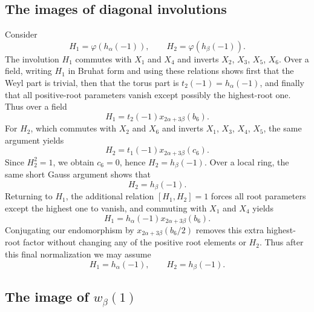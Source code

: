 \documentclass[]{jgcc}
\numberwithin{equation}{section}
\begin{document}
\subsection{The images of diagonal involutions}

Consider
\[
H_1=\varphi(h_\alpha(-1)),\qquad H_2=\varphi(h_\beta(-1)).
\]
The involution $H_1$ commutes with $X_1$ and $X_4$ and inverts $X_2$, $X_3$, $X_5$, $X_6$.
Over a field, writing $H_1$ in Bruhat form and using these relations shows first that the Weyl part is trivial, then that the torus part is $t_2(-1)=h_\alpha(-1)$, and finally that all positive-root parameters vanish except possibly the highest-root one.
Thus over a field
\[
H_1=t_2(-1)x_{2\alpha+3\beta}(b_6).
\]
For $H_2$, which commutes with $X_2$ and $X_6$ and inverts $X_1$, $X_3$, $X_4$, $X_5$, the same argument yields
\[
H_2=t_1(-1)x_{2\alpha+3\beta}(c_6).
\]
Since $H_2^2=1$, we obtain $c_6=0$, hence $H_2=h_\beta(-1)$.
Over a local ring, the same short Gauss argument shows that
\[
H_2=h_\beta(-1).
\]
Returning to $H_1$, the additional relation $[H_1,H_2]=1$ forces all root parameters except the highest one to vanish, and commuting with $X_1$ and $X_4$ yields
\[
H_1=h_\alpha(-1)x_{2\alpha+3\beta}(b_6).
\]
Conjugating our endomorphism by $x_{2\alpha+3\beta}(b_6/2)$ removes this extra highest-root factor without changing any of the positive root elements or $H_2$.
Thus after this final normalization we may assume
\[
H_1=h_\alpha(-1),\qquad H_2=h_\beta(-1).
\]

\subsection{\texorpdfstring{The image of $w_\beta(1)$}{The image of wbeta(1)}}
\end{document}
